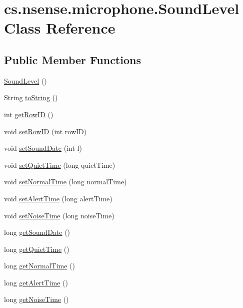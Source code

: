 \hypertarget{classcs_1_1nsense_1_1microphone_1_1_sound_level}{\section{cs.\-nsense.\-microphone.\-Sound\-Level Class Reference}
\label{classcs_1_1nsense_1_1microphone_1_1_sound_level}
}
\subsection*{Public Member Functions}
\begin{DoxyCompactItemize}
\item 
\hyperlink{classcs_1_1nsense_1_1microphone_1_1_sound_level_a6a1df51eb92d60329afb4b270f88bb99}{Sound\-Level} ()
\item 
String \hyperlink{classcs_1_1nsense_1_1microphone_1_1_sound_level_a260f6a58dc201a4936541d771a174a2f}{to\-String} ()
\item 
int \hyperlink{classcs_1_1nsense_1_1microphone_1_1_sound_level_a51f20d2a00792b549aeb046eb09b2f23}{get\-Row\-I\-D} ()
\item 
void \hyperlink{classcs_1_1nsense_1_1microphone_1_1_sound_level_a264960176967d1a5c65604aea881264d}{set\-Row\-I\-D} (int row\-I\-D)
\item 
void \hyperlink{classcs_1_1nsense_1_1microphone_1_1_sound_level_ab2f88f1b38ec29d43ec4277dce5320af}{set\-Sound\-Date} (int l)
\item 
void \hyperlink{classcs_1_1nsense_1_1microphone_1_1_sound_level_a41bbe733cc04f24489a6591456708c9a}{set\-Quiet\-Time} (long quiet\-Time)
\item 
void \hyperlink{classcs_1_1nsense_1_1microphone_1_1_sound_level_ac05eb09a941dfccee6e3b0207945c765}{set\-Normal\-Time} (long normal\-Time)
\item 
void \hyperlink{classcs_1_1nsense_1_1microphone_1_1_sound_level_a1f7806dc7bc2b2ea4a76236035bd84d3}{set\-Alert\-Time} (long alert\-Time)
\item 
void \hyperlink{classcs_1_1nsense_1_1microphone_1_1_sound_level_ab3008cfba407412e83adabe394284b23}{set\-Noise\-Time} (long noise\-Time)
\item 
long \hyperlink{classcs_1_1nsense_1_1microphone_1_1_sound_level_a11a2ce25b3db0960fff2c90d9c193cc9}{get\-Sound\-Date} ()
\item 
long \hyperlink{classcs_1_1nsense_1_1microphone_1_1_sound_level_aa2cf4669319d64b436a61c46da83892d}{get\-Quiet\-Time} ()
\item 
long \hyperlink{classcs_1_1nsense_1_1microphone_1_1_sound_level_a158cc2cd3ca6d1603adde22786b5946a}{get\-Normal\-Time} ()
\item 
long \hyperlink{classcs_1_1nsense_1_1microphone_1_1_sound_level_a33bba7128c283b307e32ae9e837cba98}{get\-Alert\-Time} ()
\item 
long \hyperlink{classcs_1_1nsense_1_1microphone_1_1_sound_level_a9eae8b19e96317437e3280bc3427632a}{get\-Noise\-Time} ()
\end{DoxyCompactItemize}
